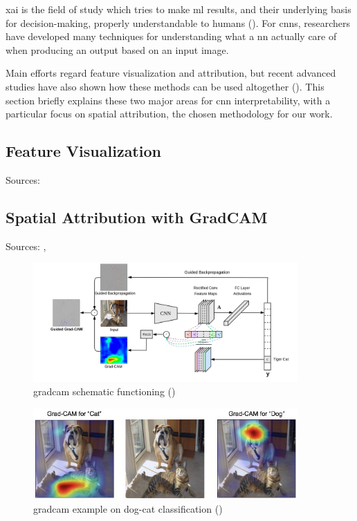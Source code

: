\medskip

\gls{xai} is the field of study which tries to make \gls{ml} results, and their underlying basis for decision-making, properly understandable to humans (\cite{xai-wiki}). For \gls{cnn}s, researchers have developed many techniques for understanding what a \gls{nn} actually care of when producing an output based on an input image. 

Main efforts regard feature visualization and attribution, but recent advanced studies have also shown how these methods can be used altogether (\cite{olah2018the}). This section briefly explains these two major areas for \gls{cnn} interpretability, with a particular focus on spatial attribution, the chosen methodology for our work.



\subsection{Feature Visualization}

Sources: \cite{olah2017feature}



\subsection{Spatial Attribution with GradCAM}
\label{subsec:gradcam-theory}

Sources: \cite{Selvaraju_2019}, \cite{gradcam_medium}

\begin{figure}[!htb]
	\centering
	\includegraphics[width=0.9\textwidth]{"contents/images/gradcam/02-gradcam-schema"}
	\caption[\gls{gradcam} schematic functioning]{\gls{gradcam} schematic functioning (\cite{Selvaraju_2019})}
	\label{fig:gradcam-schema}
\end{figure}

\begin{figure}[!htb]
\centering
\includegraphics[width=0.9\textwidth]{"contents/images/gradcam/02-gradcam-catdog"}
\caption[\gls{gradcam} example on dog-cat classification]{\gls{gradcam} example on dog-cat classification (\cite{Selvaraju_2019})}
\label{fig:gradcam-catdog}
\end{figure}




